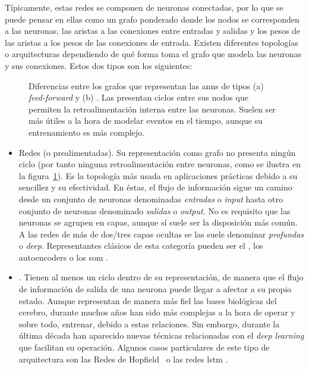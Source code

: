 Típicamente, estas redes se componen de neuronas conectadas, por lo que se puede pensar en ellas como un grafo ponderado donde los nodos se corresponden a las neuronas, las aristas a las conexiones entre entradas y salidas y los pesos de las aristas a los pesos de las conexiones de entrada. Existen diferentes topologías o arquitecturas dependiendo de qué forma toma el grafo que modela las neuronas y sus conexiones. Estos dos tipos son los siguientes:

\begin{figure}
	\centering
	\qquad
	\caption[Diferencias entre redes de tipo \textit{feed-forward} y \textit{}]{Diferencias entre los grafos que representan las \acp{ann} de tipos (a) \textit{feed-forward} y (b) . Las  presentan ciclos entre sus nodos que permiten la retroalimentación interna entre las neuronas. Suelen ser más útiles a la hora de modelar eventos en el tiempo, aunque su entrenamiento es más complejo.}
	\label{fig:ff-vs-rnn}
\end{figure}

\begin{itemize}
	\item Redes \textit{\textbf{}} (o prealimentadas). Su representación como grafo no presenta ningún ciclo (por tanto ninguna retroalimentación entre neuronas, como se ilustra en la figura~\ref{fig:ff-vs-rnn}). Es la topología más usada en aplicaciones prácticas debido a su sencillez y su efectividad. En éstas, el flujo de información sigue un camino desde un conjunto de neuronas denominadas \textit{entradas} o \textit{input} hasta otro conjunto de neuronas denominado \textit{salidas} o \textit{output}. No es requisito que las neuronas se agrupen en capas, aunque sí suele ser la disposición más común. A las redes de más de dos/tres capas ocultas se las suele denominar \textit{profundas} o \textit{deep}. Representantes clásicos de esta categoría pueden ser el  \cite{rumelhart1985learning}, los \glspl{autoencoder} \cite{Hinton2006} o los \gls{som} \cite{kohonen1998self}.
	\item {}. Tienen al menos un ciclo dentro de su representación, de manera que el flujo de información de salida de una neurona puede llegar a afectar a su propio estado. Aunque representan de manera más fiel las bases biológicas del cerebro, durante muchos años han sido más complejas a la hora de operar y sobre todo, entrenar, debido a estas relaciones. Sin embargo, durante la última década han aparecido nuevas técnicas relacionadas con el \textit{deep learning} que facilitan su operación. Algunos casos particulares de este tipo de arquitectura son las Redes de Hopfield~\cite{hopfield1982neural} o las redes \Acrfull{lstm} \cite{hochreiter1997long}.
\end{itemize}

